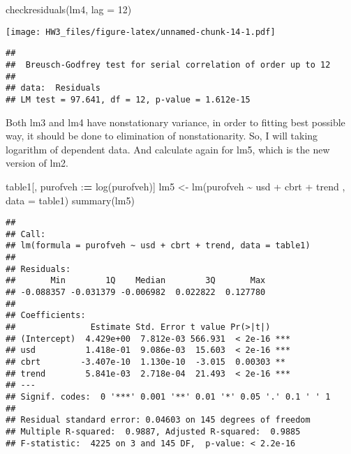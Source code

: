 \documentclass[
]{article}
\newenvironment{Shaded}{\begin{snugshade}}{\end{snugshade}}
\newcommand{\AttributeTok}[1]{\textcolor[rgb]{0.77,0.63,0.00}{#1}}
\newcommand{\DecValTok}[1]{\textcolor[rgb]{0.00,0.00,0.81}{#1}}
\newcommand{\ErrorTok}[1]{\textcolor[rgb]{0.64,0.00,0.00}{\textbf{#1}}}
\newcommand{\FunctionTok}[1]{\textcolor[rgb]{0.00,0.00,0.00}{#1}}
\newcommand{\NormalTok}[1]{#1}
\newcommand{\OtherTok}[1]{\textcolor[rgb]{0.56,0.35,0.01}{#1}}
\newcommand{\SpecialCharTok}[1]{\textcolor[rgb]{0.00,0.00,0.00}{#1}}
\begin{document}
\begin{Shaded}
\begin{Highlighting}[]
\FunctionTok{checkresiduals}\NormalTok{(lm4, }\AttributeTok{lag =} \DecValTok{12}\NormalTok{)}
\end{Highlighting}
\end{Shaded}

\texttt{[image: HW3\_files/figure-latex/unnamed-chunk-14-1.pdf]}

\begin{verbatim}
## 
##  Breusch-Godfrey test for serial correlation of order up to 12
## 
## data:  Residuals
## LM test = 97.641, df = 12, p-value = 1.612e-15
\end{verbatim}

Both lm3 and lm4 have nonstationary variance, in order to fitting best
possible way, it should be done to elimination of nonstationarity. So, I
will taking logarithm of dependent data. And calculate again for lm5,
which is the new version of lm2.

\begin{Shaded}
\begin{Highlighting}[]
\NormalTok{table1[, purofveh }\SpecialCharTok{:}\ErrorTok{=} \FunctionTok{log}\NormalTok{(purofveh)]}
\NormalTok{lm5 }\OtherTok{\textless{}{-}} \FunctionTok{lm}\NormalTok{(purofveh }\SpecialCharTok{\textasciitilde{}}\NormalTok{ usd }\SpecialCharTok{+}\NormalTok{ cbrt }\SpecialCharTok{+}\NormalTok{ trend , }\AttributeTok{data =}\NormalTok{ table1)}
\FunctionTok{summary}\NormalTok{(lm5)}
\end{Highlighting}
\end{Shaded}

\begin{verbatim}
## 
## Call:
## lm(formula = purofveh ~ usd + cbrt + trend, data = table1)
## 
## Residuals:
##       Min        1Q    Median        3Q       Max 
## -0.088357 -0.031379 -0.006982  0.022822  0.127780 
## 
## Coefficients:
##               Estimate Std. Error t value Pr(>|t|)    
## (Intercept)  4.429e+00  7.812e-03 566.931  < 2e-16 ***
## usd          1.418e-01  9.086e-03  15.603  < 2e-16 ***
## cbrt        -3.407e-10  1.130e-10  -3.015  0.00303 ** 
## trend        5.841e-03  2.718e-04  21.493  < 2e-16 ***
## ---
## Signif. codes:  0 '***' 0.001 '**' 0.01 '*' 0.05 '.' 0.1 ' ' 1
## 
## Residual standard error: 0.04603 on 145 degrees of freedom
## Multiple R-squared:  0.9887, Adjusted R-squared:  0.9885 
## F-statistic:  4225 on 3 and 145 DF,  p-value: < 2.2e-16
\end{verbatim}
\end{document}
